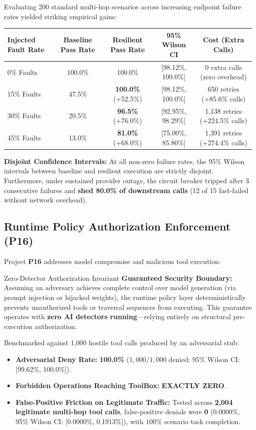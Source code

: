 Evaluating 200 standard multi-hop scenarios across increasing endpoint failure rates yielded striking empirical gains:
\begin{center}
\small
\begin{tabular}{lcccc}
\toprule
\textbf{Injected Fault Rate} & \textbf{Baseline Pass Rate} & \textbf{Resilient Pass Rate} & \textbf{95\% Wilson CI} & \textbf{Cost (Extra Calls)} \\
\midrule
0\% Faults & 100.0\% & 100.0\% & [98.12\%, 100.0\%] & 0 extra calls (zero overhead) \\
15\% Faults & 47.5\% & \textbf{100.0\%} (+52.5\%) & [98.12\%, 100.0\%] & 650 retries (+85.6\% calls) \\
30\% Faults & 20.5\% & \textbf{96.5\%} (+76.0\%) & [92.95\%, 98.29\%] & 1,138 retries (+224.5\% calls) \\
45\% Faults & 13.0\% & \textbf{81.0\%} (+68.0\%) & [75.00\%, 85.80\%] & 1,391 retries (+274.4\% calls) \\
\bottomrule
\end{tabular}
\end{center}
\textbf{Disjoint Confidence Intervals:} At all non-zero failure rates, the 95\% Wilson intervals between baseline and resilient execution are strictly disjoint. Furthermore, under sustained provider outage, the circuit breaker tripped after 3 consecutive failures and \textbf{shed 80.0\% of downstream calls} (12 of 15 fast-failed without network overhead).

\subsection{Runtime Policy Authorization Enforcement (P16)}
Project \textbf{P16} addresses model compromise and malicious tool execution:
\begin{callout}[primary]{Zero-Detector Authorization Invariant}
\textbf{Guaranteed Security Boundary:} Assuming an adversary achieves complete control over model generation (via prompt injection or hijacked weights), the runtime policy layer deterministically prevents unauthorized tools or traversal sequences from executing. This guarantee operates with \textbf{zero AI detectors running}---relying entirely on structural pre-execution authorization.
\end{callout}
Benchmarked against 1,000 hostile tool calls produced by an adversarial stub:
\begin{itemize}
    \item \textbf{Adversarial Deny Rate:} \textbf{100.0\%} ($1,000 / 1,000$ denied; 95\% Wilson CI: [99.62\%, 100.0\%]).
    \item \textbf{Forbidden Operations Reaching ToolBox:} \textbf{EXACTLY ZERO}.
    \item \textbf{False-Positive Friction on Legitimate Traffic:} Tested across \textbf{2,004 legitimate multi-hop tool calls}, false-positive denials were \textbf{0} (0.0000\%, 95\% Wilson CI: [0.0000\%, 0.1913\%]), with $100\%$ scenario task completion.
\end{itemize}

